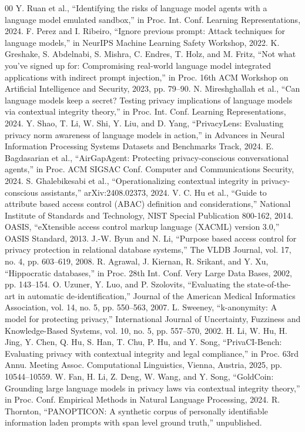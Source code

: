 \documentclass[conference]{IEEEtran}
\begin{document}
\begin{thebibliography}{00}
 Y. Ruan et al., ``Identifying the risks of language model agents with a language model emulated sandbox,'' in Proc. Int. Conf. Learning Representations, 2024.
 F. Perez and I. Ribeiro, ``Ignore previous prompt: Attack techniques for language models,'' in NeurIPS Machine Learning Safety Workshop, 2022.
 K. Greshake, S. Abdelnabi, S. Mishra, C. Endres, T. Holz, and M. Fritz, ``Not what you've signed up for: Compromising real-world language model integrated applications with indirect prompt injection,'' in Proc. 16th ACM Workshop on Artificial Intelligence and Security, 2023, pp. 79--90.
 N. Mireshghallah et al., ``Can language models keep a secret? Testing privacy implications of language models via contextual integrity theory,'' in Proc. Int. Conf. Learning Representations, 2024.
 Y. Shao, T. Li, W. Shi, Y. Liu, and D. Yang, ``PrivacyLens: Evaluating privacy norm awareness of language models in action,'' in Advances in Neural Information Processing Systems Datasets and Benchmarks Track, 2024.
 E. Bagdasarian et al., ``AirGapAgent: Protecting privacy-conscious conversational agents,'' in Proc. ACM SIGSAC Conf. Computer and Communications Security, 2024.
 S. Ghalebikesabi et al., ``Operationalizing contextual integrity in privacy-conscious assistants,'' arXiv:2408.02373, 2024.
 V. C. Hu et al., ``Guide to attribute based access control (ABAC) definition and considerations,'' National Institute of Standards and Technology, NIST Special Publication 800-162, 2014.
 OASIS, ``eXtensible access control markup language (XACML) version 3.0,'' OASIS Standard, 2013.
 J.-W. Byun and N. Li, ``Purpose based access control for privacy protection in relational database systems,'' The VLDB Journal, vol. 17, no. 4, pp. 603--619, 2008.
 R. Agrawal, J. Kiernan, R. Srikant, and Y. Xu, ``Hippocratic databases,'' in Proc. 28th Int. Conf. Very Large Data Bases, 2002, pp. 143--154.
 O. Uzuner, Y. Luo, and P. Szolovits, ``Evaluating the state-of-the-art in automatic de-identification,'' Journal of the American Medical Informatics Association, vol. 14, no. 5, pp. 550--563, 2007.
 L. Sweeney, ``k-anonymity: A model for protecting privacy,'' International Journal of Uncertainty, Fuzziness and Knowledge-Based Systems, vol. 10, no. 5, pp. 557--570, 2002.
 H. Li, W. Hu, H. Jing, Y. Chen, Q. Hu, S. Han, T. Chu, P. Hu, and Y. Song, ``PrivaCI-Bench: Evaluating privacy with contextual integrity and legal compliance,'' in Proc. 63rd Annu. Meeting Assoc. Computational Linguistics, Vienna, Austria, 2025, pp. 10544--10559.
 W. Fan, H. Li, Z. Deng, W. Wang, and Y. Song, ``GoldCoin: Grounding large language models in privacy laws via contextual integrity theory,'' in Proc. Conf. Empirical Methods in Natural Language Processing, 2024.
 R. Thornton, ``PANOPTICON: A synthetic corpus of personally identifiable information laden prompts with span level ground truth,'' unpublished.
\end{thebibliography}
\end{document}
